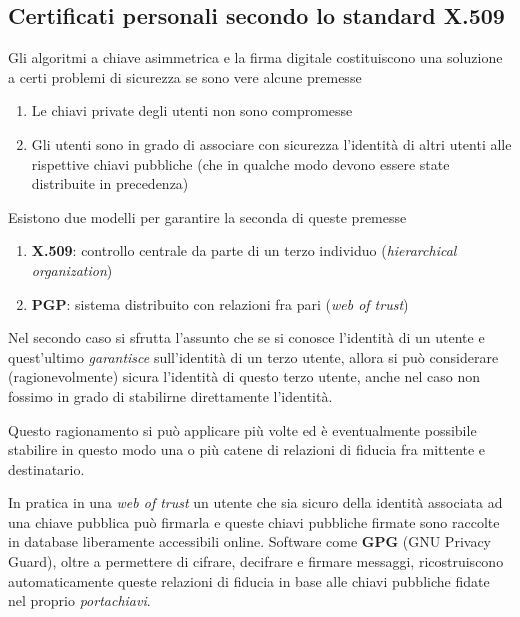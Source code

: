 \documentclass[italian,]{article}
\providecommand{\tightlist}{%
  \setlength{\itemsep}{0pt}\setlength{\parskip}{0pt}}
\begin{document}
\subsection{Certificati personali secondo lo standard
X.509}\label{certificati-personali-secondo-lo-standard-x.509}

Gli algoritmi a chiave asimmetrica e la firma digitale costituiscono una
soluzione a certi problemi di sicurezza se sono vere alcune premesse

\begin{enumerate}
\def\labelenumi{\arabic{enumi}.}
\tightlist
\item
  Le chiavi private degli utenti non sono compromesse
\item
  Gli utenti sono in grado di associare con sicurezza l'identità di
  altri utenti alle rispettive chiavi pubbliche (che in qualche modo
  devono essere state distribuite in precedenza)
\end{enumerate}

Esistono due modelli per garantire la seconda di queste premesse

\begin{enumerate}
\def\labelenumi{\arabic{enumi}.}
\tightlist
\item
  \textbf{X.509}: controllo centrale da parte di un terzo individuo
  (\emph{hierarchical organization})
\item
  \textbf{PGP}: sistema distribuito con relazioni fra pari (\emph{web of
  trust})
\end{enumerate}

Nel secondo caso si sfrutta l'assunto che se si conosce l'identità di un
utente e quest'ultimo \emph{garantisce} sull'identità di un terzo
utente, allora si può considerare (ragionevolmente) sicura l'identità di
questo terzo utente, anche nel caso non fossimo in grado di stabilirne
direttamente l'identità.

Questo ragionamento si può applicare più volte ed è eventualmente
possibile stabilire in questo modo una o più catene di relazioni di
fiducia fra mittente e destinatario.

In pratica in una \emph{web of trust} un utente che sia sicuro della
identità associata ad una chiave pubblica può firmarla e queste chiavi
pubbliche firmate sono raccolte in database liberamente accessibili
online. Software come \textbf{GPG} (GNU Privacy Guard), oltre a
permettere di cifrare, decifrare e firmare messaggi, ricostruiscono
automaticamente queste relazioni di fiducia in base alle chiavi
pubbliche fidate nel proprio \emph{portachiavi}.
\end{document}

